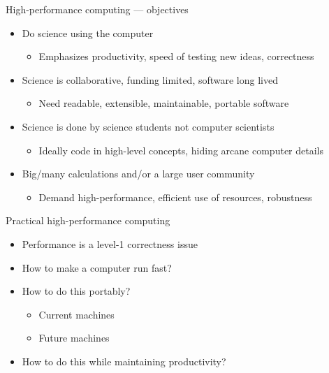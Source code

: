 \begin{frame}{High-performance computing --- objectives}

  \begin{itemize}
  \item Do science using the computer
    \begin{itemize}
    \item Emphasizes productivity, speed of testing new ideas, correctness
    \end{itemize}
    
  \item Science is collaborative, funding limited, software long lived
      \begin{itemize}
      \item Need readable, extensible, maintainable, portable software
      \end{itemize}
      
  \item Science is done by science students not computer scientists
      \begin{itemize}
      \item Ideally code in high-level concepts, hiding arcane computer details
      \end{itemize}

  \item Big/many calculations and/or a large user community
      \begin{itemize}
      \item Demand high-performance, efficient use of resources, robustness
      \end{itemize}
  \end{itemize}
\end{frame}

\begin{frame}{Practical high-performance computing}
  \begin{itemize}
  \item Performance is a level-1 correctness issue
  \item How to make a computer run fast?
  \item How to do this portably?
    \begin{itemize}
    \item Current machines
    \item Future machines
    \end{itemize}
  \item How to do this while maintaining productivity?
  \end{itemize}
\end{frame}

